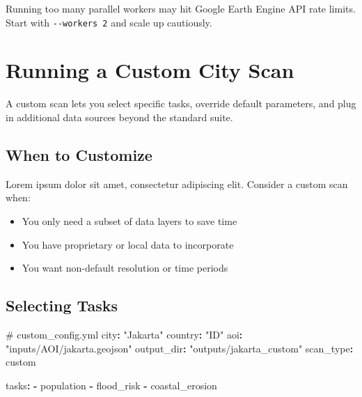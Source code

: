 \documentclass[
  letterpaper,
  DIV=11,
  numbers=noendperiod]{scrreprt}
\newenvironment{Shaded}{\begin{snugshade}}{\end{snugshade}}
\newcommand{\AttributeTok}[1]{\textcolor[rgb]{0.40,0.45,0.13}{#1}}
\newcommand{\CommentTok}[1]{\textcolor[rgb]{0.37,0.37,0.37}{#1}}
\newcommand{\FunctionTok}[1]{\textcolor[rgb]{0.28,0.35,0.67}{#1}}
\newcommand{\KeywordTok}[1]{\textcolor[rgb]{0.00,0.23,0.31}{\textbf{#1}}}
\newcommand{\StringTok}[1]{\textcolor[rgb]{0.13,0.47,0.30}{#1}}
\providecommand{\tightlist}{%
  \setlength{\itemsep}{0pt}\setlength{\parskip}{0pt}}
\begin{document}
\begin{tcolorbox}[enhanced jigsaw, arc=.35mm, bottomrule=.15mm, bottomtitle=1mm, breakable, colback=white, colbacktitle=quarto-callout-warning-color!10!white, colframe=quarto-callout-warning-color-frame, coltitle=black, left=2mm, leftrule=.75mm, opacityback=0, opacitybacktitle=0.6, rightrule=.15mm, title=\textcolor{quarto-callout-warning-color}{\faExclamationTriangle}\hspace{0.5em}{Warning}, titlerule=0mm, toprule=.15mm, toptitle=1mm]

Running too many parallel workers may hit Google Earth Engine API rate
limits. Start with \texttt{-\/-workers\ 2} and scale up cautiously.

\end{tcolorbox}

\chapter{Running a Custom City Scan}\label{running-a-custom-city-scan}

A custom scan lets you select specific tasks, override default
parameters, and plug in additional data sources beyond the standard
suite.

\section{When to Customize}\label{when-to-customize}

Lorem ipsum dolor sit amet, consectetur adipiscing elit. Consider a
custom scan when:

\begin{itemize}
\tightlist
\item
  You only need a subset of data layers to save time
\item
  You have proprietary or local data to incorporate
\item
  You want non-default resolution or time periods
\end{itemize}

\section{Selecting Tasks}\label{selecting-tasks}

\begin{Shaded}
\begin{Highlighting}[]
\CommentTok{\# custom\_config.yml}
\FunctionTok{city}\KeywordTok{:}\AttributeTok{ }\StringTok{"Jakarta"}
\FunctionTok{country}\KeywordTok{:}\AttributeTok{ }\StringTok{"ID"}
\FunctionTok{aoi}\KeywordTok{:}\AttributeTok{ }\StringTok{"inputs/AOI/jakarta.geojson"}
\FunctionTok{output\_dir}\KeywordTok{:}\AttributeTok{ }\StringTok{"outputs/jakarta\_custom"}
\FunctionTok{scan\_type}\KeywordTok{:}\AttributeTok{ custom}

\FunctionTok{tasks}\KeywordTok{:}
\AttributeTok{  }\KeywordTok{{-}}\AttributeTok{ population}
\AttributeTok{  }\KeywordTok{{-}}\AttributeTok{ flood\_risk}
\AttributeTok{  }\KeywordTok{{-}}\AttributeTok{ coastal\_erosion}
\end{Highlighting}
\end{Shaded}
\end{document}

